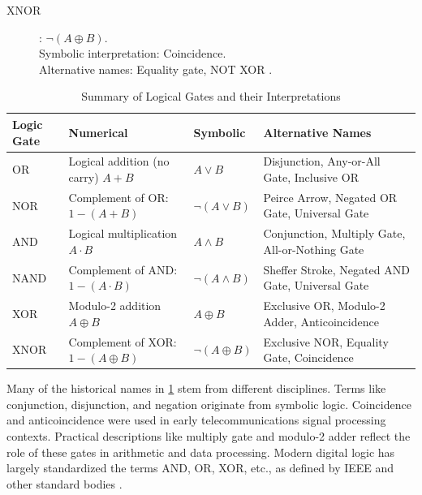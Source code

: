 \begin{description}
\item[XNOR]: \( \neg (A \oplus B) \). \\
    Symbolic interpretation: Coincidence. \\
    Alternative names: Equality gate, NOT XOR \cite{mano2017, rosen2018}.
\end{description}

\begin{table}[htbp]
\centering
\renewcommand{\arraystretch}{1.5} %
\setlength{\tabcolsep}{5pt} %
\begin{tabular}{|>{\centering\arraybackslash}p{2cm}|>{\centering\arraybackslash}p{3cm}|>{\centering\arraybackslash}p{2cm}|>{\centering\arraybackslash}p{5cm}|}
\hline
\textbf{Logic Gate} & \textbf{Numerical} & \textbf{Symbolic} & \textbf{Alternative Names} \\ \hline

OR  & Logical addition (no carry) \( A + B \) & \( A \lor B \) & Disjunction, Any-or-All Gate, Inclusive OR \\ \hline

NOR  & Complement of OR: \( 1 - (A + B) \) & \( \neg (A \lor B) \) & Peirce Arrow, Negated OR Gate, Universal Gate \\ \hline

AND & Logical multiplication \( A \cdot B \) & \( A \land B \) & Conjunction, Multiply Gate, All-or-Nothing Gate \\ \hline

NAND  & Complement of AND: \( 1 - (A \cdot B) \) & \( \neg (A \land B) \) & Sheffer Stroke, Negated AND Gate, Universal Gate \\ \hline

XOR  & Modulo-2 addition \( A \oplus B \) & \( A \oplus B \) & Exclusive OR, Modulo-2 Adder, Anticoincidence \\ \hline

XNOR  & Complement of XOR: \( 1 - (A \oplus B) \) & \( \neg (A \oplus B) \) & Exclusive NOR, Equality Gate, Coincidence \\ \hline

\end{tabular}
\caption{Summary of Logical Gates and their Interpretations}
\label{tab:logic_gates_summary}
\end{table}

Many of the historical names in \ref{tab:logic_gates_summary} stem from different disciplines. Terms like conjunction, disjunction, and negation originate from symbolic logic. Coincidence and anticoincidence were used in early telecommunications signal processing contexts. Practical descriptions like multiply gate and modulo-2 adder reflect the role of these gates in arithmetic and data processing. Modern digital logic has largely standardized the terms AND, OR, XOR, etc., as defined by IEEE and other standard bodies \cite{ieee_std_91}.

